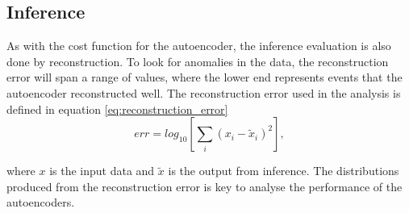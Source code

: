 


\subsection*{Inference}\label{sec:ae_inference}
As with the cost function for the autoencoder, the inference evaluation is also done by reconstruction. 
To look for anomalies in the data, the reconstruction error will span a range of values, where the 
lower end represents events that the autoencoder reconstructed well. The reconstruction error used 
in the analysis is defined in equation \ref{eq:reconstruction_error} 
\begin{equation}\label{eq:reconstruction_error}
    err = log_{10} \left[ \sum_i (x_i - \tilde{x}_i)^2 \right],
\end{equation}

where $x$ is the input data and $\tilde{x}$ is the output from inference. The distributions produced 
from the reconstruction error is key to analyse the performance of the autoencoders.
